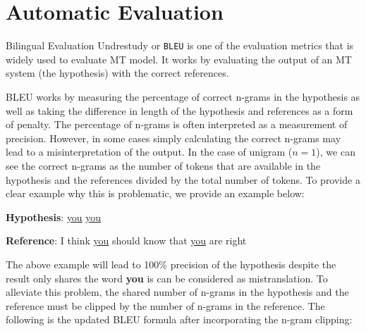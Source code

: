 \section{Automatic Evaluation}
\label{sec:aeval}
Bilingual Evaluation Undrestudy or \texttt{BLEU} \cite{BLEU} is one of the evaluation metrics that is widely used to evaluate MT model. It works by evaluating the output of an MT system (the hypothesis) with the correct references.

BLEU works by measuring the percentage of correct n-grams in the hypothesis as well as taking the difference in length of the hypothesis and references as a form of penalty. The percentage of n-grams is often interpreted as a measurement of precision. However, in some cases simply calculating the correct n-grams may lead to a misinterpretation of the output. In the case of unigram ($n=1$), we can see the correct n-grams as the number of tokens that are available in the hypothesis and the references divided by the total number of tokens. To provide a clear example why this is problematic, we provide an example below:

\bigskip

\textbf{Hypothesis}: \underline{you} \underline{you}

\textbf{Reference}: I think \underline{you} should know that \underline{you} are right

\bigskip

The above example will lead to 100\% precision of the hypothesis despite the result only shares the word \textbf{you} is can be considered as mistranslation. To alleviate this problem, the shared number of n-grams in the hypothesis and the reference must be clipped by the number of n-grams in the reference. The following is the updated BLEU formula after incorporating the n-gram clipping:

